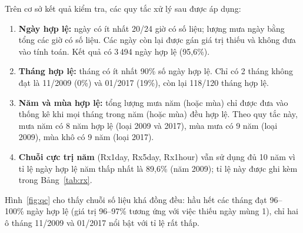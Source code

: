 Trên cơ sở kết quả kiểm tra, các quy tắc xử lý sau được áp dụng:

\begin{enumerate}[label=(\arabic*), leftmargin=1.5cm]
  \item \textbf{Ngày hợp lệ:} ngày có ít nhất 20/24 giờ có số liệu; lượng mưa ngày bằng tổng các giờ có số liệu. Các ngày còn lại được gán giá trị thiếu và không đưa vào tính toán. Kết quả có 3\,494 ngày hợp lệ (95,6\%).
  \item \textbf{Tháng hợp lệ:} tháng có ít nhất 90\% số ngày hợp lệ. Chỉ có 2 tháng không đạt là 11/2009 (0\%) và 01/2017 (19\%), còn lại 118/120 tháng hợp lệ.
  \item \textbf{Năm và mùa hợp lệ:} tổng lượng mưa năm (hoặc mùa) chỉ được đưa vào thống kê khi mọi tháng trong năm (hoặc mùa) đều hợp lệ. Theo quy tắc này, mưa năm có 8 năm hợp lệ (loại 2009 và 2017), mùa mưa có 9 năm (loại 2009), mùa khô có 9 năm (loại 2017).
  \item \textbf{Chuỗi cực trị năm} (Rx1day, Rx5day, Rx1hour) vẫn sử dụng đủ 10 năm vì tỉ lệ ngày hợp lệ năm thấp nhất là 89,6\% (năm 2009); tỉ lệ này được ghi kèm trong Bảng~\ref{tab:rx}.
\end{enumerate}


Hình~\ref{fig:qc} cho thấy chuỗi số liệu khá đồng đều: hầu hết các tháng đạt 96--100\% ngày hợp lệ (giá trị 96--97\% tương ứng với việc thiếu ngày mùng 1), chỉ hai ô tháng 11/2009 và 01/2017 nổi bật với tỉ lệ rất thấp.
